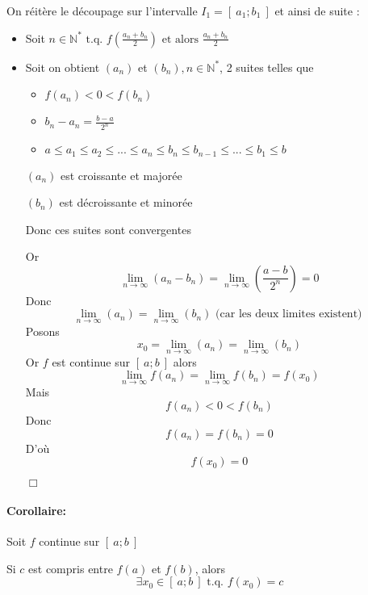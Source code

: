 \documentclass[
    11pt,
    a4paper,
    oneside,
    headinlcude, footinclude,
    twoside,
]{report}
\newcommand{\tq}[0]{\textrm{ t.q. }}
\newcommand{\cqfd}[0]{\begin{flushright}$\Box$\end{flushright}}
\begin{document}
On réitère le découpage sur l'intervalle $I_{1} = [\ a_{1}; b_{1}\ ]$ et ainsi
de suite :

\begin{itemize}
\item Soit $n \in \mathbb{N}^{*} \tq f \left(\frac{a_{n} + b_{n}}{2}\right)
\text{ et alors } \frac{a_{n} + b_{n}}{2}$

\item Soit on obtient $(a_{n})$ et $(b_{n}), n \in \mathbb{N}^{*}$, 2
suites telles que
        
\begin{itemize}
\item $f(a_{n}) < 0 < f(b_{n})$
\item $b_{n} - a_{n} = \frac{b - a }{2^{n}}$
\item $a \leq a_{1} \leq a_{2} \leq ... \leq a_{n} \leq b_{n} \leq
b_{n-1} \leq ... \leq b_{1} \leq b$
\end{itemize}

$(a_{n})$ est croissante et majorée

$(b_{n})$ est décroissante et minorée

Donc ces suites sont convergentes

Or $$ \lim_{n \to \infty} (a_{n} - b_{n}) = \lim_{n \to \infty} \left(\frac{a-b}{2^{n}}\right)
= 0$$
Donc $$ \lim_{n \to \infty} (a_{n}) = \lim_{n \to \infty} (b_{n}) \text{ (car
les deux limites existent) }$$
Posons $$x_{0} = \lim_{n \to \infty} (a_{n}) = \lim_{n \to \infty} (b_{n})$$
Or $f$ est continue sur $[\ a; b\ ]$ alors $$ \lim_{n \to \infty} f(a_{n})
= \lim_{n \to \infty} f(b_{n}) = f(x_{0})$$
Mais $$f(a_{n}) < 0 < f(b_{n})$$
Donc $$f(a_{n}) = f(b_{n}) = 0$$
D'où $$f(x_{0}) = 0$$
\cqfd
\end{itemize}

\paragraph{Corollaire:}

Soit $f$ continue sur $[\ a; b\ ]$ 

Si $c$ est compris entre $f(a)$ et $f(b)$, alors $$\exists x_{0} \in [\ a; b\ ]
\tq f(x_{0}) = c$$
\end{document}
